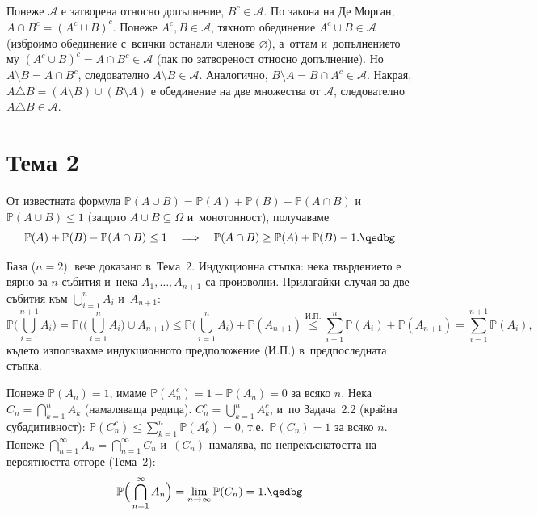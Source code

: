 \begin{proofbox}
Понеже $\mathcal A$ е затворена относно допълнение, $B^c\in\mathcal
A$. По закона на Де Морган, $A\cap B^c = (A^c\cup B)^c$. Понеже
$A^c,B\in\mathcal A$, тяхното обединение $A^c\cup B\in\mathcal A$
(изброимо обединение с~всички останали членове $\varnothing$), а~оттам и~допълнението му $(A^c\cup B)^c=A\cap B^c\in\mathcal A$ (пак
по затвореност относно допълнение). Но $A\setminus B = A\cap B^c$,
следователно $A\setminus B\in\mathcal A$. Аналогично, $B\setminus A
= B\cap A^c\in\mathcal A$. Накрая, $A\triangle B = (A\setminus B)
\cup(B\setminus A)$ е обединение на две множества от $\mathcal A$,
следователно $A\triangle B\in\mathcal A$. \qedbg
\end{proofbox}

\section*{Тема 2}

\begin{proofbox}
От известната формула $\mathbb P(A\cup B)=\mathbb P(A)+\mathbb P(B)-
\mathbb P(A\cap B)$ и~$\mathbb P(A\cup B)\le1$ (защото $A\cup B
\subseteq\Omega$ и~монотонност), получаваме
\[
  \mathbb P(A)+\mathbb P(B)-\mathbb P(A\cap B) \le 1 \quad
  \Longrightarrow\quad \mathbb P(A\cap B) \ge \mathbb P(A)+\mathbb
  P(B)-1. \qedbg
\]
\end{proofbox}

\begin{proofbox}
База ($n=2$): вече доказано в~Тема~2. Индукционна стъпка: нека
твърдението е вярно за $n$ събития и~нека $A_1,\dots,A_{n+1}$ са
произволни. Прилагайки случая за две събития към $\bigcup_{i=1}^n
A_i$ и~$A_{n+1}$:
\[
  \mathbb P\Big(\bigcup_{i=1}^{n+1}A_i\Big) = \mathbb P\Big(\Big(
  \bigcup_{i=1}^n A_i\Big)\cup A_{n+1}\Big) \le \mathbb P\Big(
  \bigcup_{i=1}^n A_i\Big) + \mathbb P(A_{n+1}) \overset{\text{И.П.}}
  \le \sum_{i=1}^n \mathbb P(A_i) + \mathbb P(A_{n+1}) = \sum_{i=1}^{n+1}
  \mathbb P(A_i),
\]
където използвахме индукционното предположение (И.П.) в~предпоследната
стъпка. \qedbg
\end{proofbox}

\begin{proofbox}
Понеже $\mathbb P(A_n)=1$, имаме $\mathbb P(A_n^c)=1-\mathbb P(A_n)=0$
за всяко $n$. Нека $C_n=\bigcap_{k=1}^n A_k$ (намаляваща редица).
$C_n^c=\bigcup_{k=1}^n A_k^c$, и~по Задача~2.2 (крайна субадитивност):
$\mathbb P(C_n^c)\le\sum_{k=1}^n\mathbb P(A_k^c)=0$, т.е.\ $\mathbb
P(C_n)=1$ за всяко $n$. Понеже $\bigcap_{n=1}^{\infty}A_n=
\bigcap_{n=1}^{\infty}C_n$ и~$(C_n)$ намалява, по непрекъснатостта
на вероятността отгоре (Тема~2):
\[
  \mathbb P\Big(\bigcap_{n=1}^{\infty}A_n\Big) = \lim_{n\to\infty}
  \mathbb P(C_n) = 1. \qedbg
\]
\end{proofbox}

